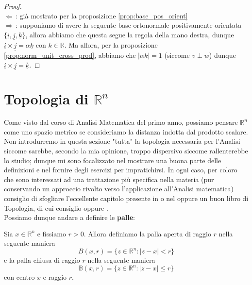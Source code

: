 %
\begin{proof} \hfill \\
$\boxed{\Leftarrow} \,$: già mostrato per la proposizione \ref{prop:base_pos_orient} \\
$\boxed{\Rightarrow} \,$: supponiamo di avere la seguente base ortonormale positivamente orientata $\{\underline{i}, \underline{j}, \underline{k} \}$, allora abbiamo che questa segue la regola della mano destra, dunque $\underline{i} \times \underline{j} = \alpha \underline{k}$ con $k \in \mathbb{R}$. Ma allora, per la proposizione \ref{prop:norm_unit_cross_prod}, abbiamo che $|\alpha \underline{k}|=1$ (siccome $\underline{v} \perp \underline{w}$) dunque $\underline{i} \times \underline{j} = \underline{k}$. 	
\end{proof}
%
%
%
%
\vspace{0.5cm}
\section{Topologia di $\mathbb{R}^n$}
Come visto dal corso di Analisi Matematica del primo anno, possiamo pensare $\mathbb{R}^n$ come uno spazio metrico se consideriamo la distanza indotta dal prodotto scalare. Non introdurremo in questa sezione "tutta" la topologia necessaria per l'Analisi siccome sarebbe, secondo la mia opinione, troppo dispersivo siccome rallenterebbe lo studio; dunque mi sono focalizzato nel mostrare una buona parte delle definizioni e nel fornire degli esercizi per impratichirsi. In ogni caso, per coloro che sono interessati
ad una trattazione più specifica nella materia (pur conservando un approccio rivolto verso l'applicazione all'Analisi matematica) consiglio di sfogliare l'eccellente capitolo presente in \cite{rudin} o nel \cite{ambrosio} oppure un buon libro di Topologia, di cui consiglio \cite{manetti} oppure \cite{munkres}. \\
Possiamo dunque andare a definire le \textbf{palle}:
%
\vspace{0.5cm}
\begin{definition}[\textcolor{blue}{palle aperte e chiuse}]
Sia $x \in \mathbb{R}^n$ e fissiamo $r > 0$. Allora definiamo la palla aperta di raggio $r$ nella seguente maniera
\[
B(x, r) = \{ z \in \mathbb{R}^n: |z-x| < r \}
\]
e la palla chiusa di raggio $r$ nella seguente maniera
\[
\mathbb{B}(x, r) = \{ z \in \mathbb{R}^n: |z - x| \leq r \}
\]
con centro $x$ e raggio $r$.
\end{definition}
%
%
%
%
